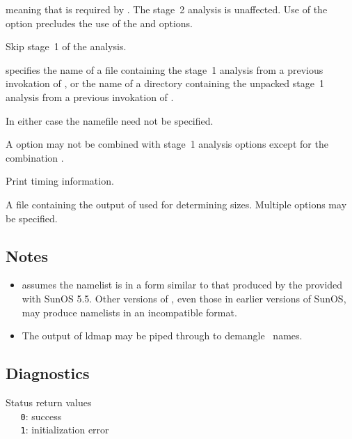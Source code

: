 \begin{description}
   \noindent
   meaning that  is required by .  The stage~2 analysis is
   unaffected.  Use of the  option precludes the use of the 
   and  options.

\item[\code{\exe{-s} file | \exe{-S} directory}]
   Skip stage~1 of the analysis.

    specifies the name of a file containing the stage~1 analysis from
   a previous invokation of , or the name of a directory
   containing the unpacked stage~1 analysis from a previous invokation of
   .

   In either case the namefile need not be specified.

   A  option may not be combined with stage~1 analysis options except
   for the combination .

\item[\exe{-t}]
   Print timing information.

\item[\code{\exe{-v} file}]
   A file containing the output of  used for determining sizes.
   Multiple  options may be specified.
\end{description}

\subsection*{Notes}

\begin{itemize}
\item
    assumes the namelist is in a form similar to that produced by
   the  provided with SunOS 5.5.  Other versions of ,
   even those in earlier versions of SunOS, may produce namelists in an
   incompatible format.

\item
   The output of ldmap may be piped through  to demangle
   \cplusplus\ names.
\end{itemize}

\subsection*{Diagnostics}

Status return values
\\ \verb+   0+: success
\\ \verb+   1+: initialization error


